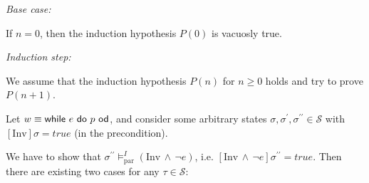 \textit{Base case:}

If $n=0$, then the induction hypothesis $P(0)$ is vacuosly true.

\bigskip

\textit{Induction step:}

We assume that the induction hypothesis $P(n)$ for $n\geq 0$ holds and try
to prove $P(n+1)$.

Let $w\equiv \kw{while}\ e\ \kw{do}\ p\ \kw{od}$, and consider some
arbitrary states $\sigma ,\sigma ^{\prime },\sigma ^{\prime \prime }\in 
\mathcal{S}$ with $[\mathrm{Inv}]\sigma =true$ (in the precondition).

We have to show that $\sigma ^{\prime \prime }\vDash _{\mathrm{par}}^{I}(%
\mathrm{Inv}\,\wedge \,\lnot e)$, i.e. $[\mathrm{Inv}\,\wedge \,\lnot
e]\sigma ^{\prime \prime }=true$. Then there are existing two cases for any $%
\tau \in \mathcal{S}$:

\bigskip

